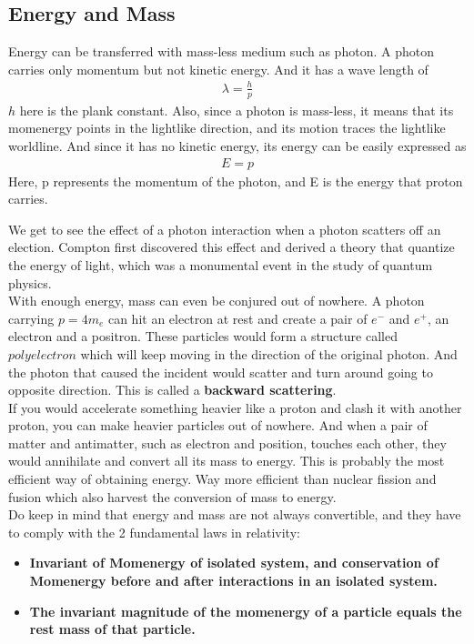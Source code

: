 \documentclass[12pt]{book}
\begin{document}
\subsection{Energy and Mass}
Energy can be transferred with mass-less medium such as photon. A photon carries only momentum but not kinetic energy. And it has a wave length of 
\begin{align}
\lambda = \frac{h}{p}
\end{align}
$h$ here is the plank constant. Also, since a photon is mass-less, it means that its momenergy points in the lightlike direction, and its motion traces the lightlike worldline. And since it has no kinetic energy, its energy can be easily expressed as 
\begin{align}
E = p 
\end{align}
Here, p represents the momentum of the photon, and E is the energy that proton carries. \\
\newline

We get to see the effect of a photon interaction when a photon scatters off an election. Compton first discovered this effect and derived a theory that quantize the energy of light, which was a monumental event in the study of quantum physics.\\
\newline
With enough energy, mass can even be conjured out of nowhere. A photon carrying $p=4m_e$ can hit an electron at rest and create a pair of $e^-$ and $e^+$, an electron and a positron. These particles would form a structure called $polyelectron$ which will keep moving in the direction of the original photon. And the photon that caused the incident would scatter and turn around going to opposite direction. This is called a \textbf{backward scattering}. \\
\newline
If you would accelerate something heavier like a proton and clash it with another proton, you can make heavier particles out of nowhere. And when a pair of matter and antimatter, such as electron and position, touches each other, they would annihilate and convert all its mass to energy. This is probably the most efficient way of obtaining energy. Way more efficient than nuclear fission and fusion which also harvest the conversion of mass to energy. \\
\newline
Do keep in mind that energy and mass are not always convertible, and they have to comply with the 2 fundamental laws in relativity:
\begin{itemize}
    \item \textbf{Invariant of Momenergy of isolated system, and conservation of Momenergy before and after interactions in an isolated system.}
    \item \textbf{The invariant magnitude of the momenergy of a particle equals the rest mass of that particle. }
\end{itemize}
\end{document}
